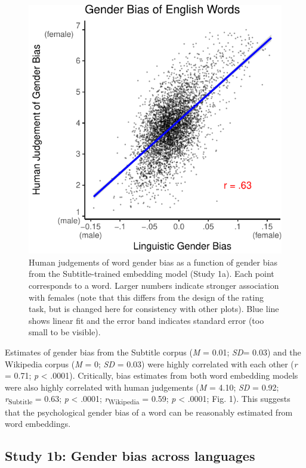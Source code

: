 \documentclass[9pt,twocolumn,twoside,lineno]{pnas-new}
\begin{document}
\begin{figure}
\centering
\includegraphics[width=.8\linewidth]{iat_lang_files/figure-latex/unnamed-chunk-10-1.pdf}
\caption{\label{fig:unnamed-chunk-10}Human judgements of word gender bias as
a function of gender bias from the Subtitle-trained embedding model
(Study 1a). Each point corresponds to a word. Larger numbers indicate
stronger association with females (note that this differs from the
design of the rating task, but is changed here for consistency with
other plots). Blue line shows linear fit and the error band indicates
standard error (too small to be visible).}
\end{figure}

Estimates of gender bias from the Subtitle corpus (\emph{M} = 0.01;
\emph{SD}= 0.03) and the Wikipedia corpus (\emph{M} = 0; \emph{SD} =
0.03) were highly correlated with each other (\emph{r} = 0.71; \emph{p}
\textless{} .0001). Critically, bias estimates from both word embedding
models were also highly correlated with human judgements (\emph{M} =
4.10; \emph{SD} = 0.92; \emph{r}\textsubscript{Subtitle} = 0.63;
\emph{p} \textless{} .0001; \emph{r}\textsubscript{Wikipedia} = 0.59;
\emph{p} \textless{} .0001; Fig. 1). This suggests that the
psychological gender bias of a word can be reasonably estimated from
word embeddings.

\subsection*{Study 1b: Gender bias across
languages}\label{study-1b-gender-bias-across-languages}
\end{document}
